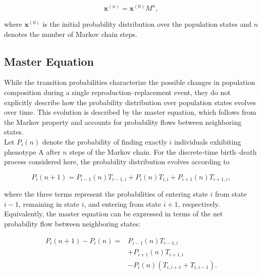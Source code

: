 \begin{equation}
\mathbf{x}^{(n)}=\mathbf{x}^{(0)}M^n,
\label{eq:markov_evolution}
\end{equation}

where \(\mathbf{x}^{(0)}\) is the initial probability distribution over the population states and \(n\) denotes the number of Markov chain steps.
\clearpage

\subsection{Master Equation}
\label{sec:master}

While the transition probabilities characterize the possible changes in population composition during a single reproduction--replacement event, they do not explicitly describe how the probability distribution over population states evolves over time. This evolution is described by the master equation, which follows from the Markov property and accounts for probability flows between neighboring states. \\ 

Let \(P_i(n)\) denote the probability of finding exactly \(i\) individuals exhibiting phenotype A after \(n\) steps of the Markov chain. For the discrete-time birth--death process considered here, the probability distribution evolves according to

\begin{equation}
    P_i(n+1)
    =
    P_{i-1}(n)T_{i-1,i}
    +
    P_i(n)T_{i,i}
    +
    P_{i+1}(n)T_{i+1,i},
    \label{eq:probDynamics}
\end{equation}

where the three terms represent the probabilities of entering state \(i\) from state \(i-1\), remaining in state \(i\), and entering from state \(i+1\), respectively.\\ 

Equivalently, the master equation can be expressed in terms of the net probability flow between neighboring states:

\begin{equation}
\begin{aligned}
    P_i(n+1)-P_i(n)
    ={}&
    P_{i-1}(n)T_{i-1,i}\\
    &+P_{i+1}(n)T_{i+1,i}\\
    &-P_i(n)\left(T_{i,i+1}+T_{i,i-1}\right).
\end{aligned}
\label{eq:Nose}
\end{equation}


